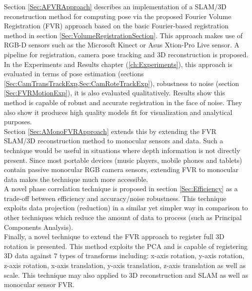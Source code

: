 Section \ref{Sec:AFVRApproach} describes an implementation of a SLAM/3D reconstruction method for computing pose via the proposed Fourier Volume Registration (FVR) approach based on the basic Fourier-based registration method in section \ref{Sec:VolumeRegistrationSection}. This approach makes use of RGB-D sensors such as the Microsoft Kinect or Asus Xtion-Pro Live sensor. A pipeline for registration, camera pose tracking and 3D reconstruction is proposed. In the Experiments and Results chapter (\ref{ch:Experiments}), this approach is evaluated in terms of pose estimation (sections \ref{Sec:CamTransTrackExp,Sec:CamRoteTrackExp}), robustness to noise (section \ref{Sec:FVRMotionExp}), it is also evaluated qualitatively. Results show this method is capable of robust and accurate registration in the face of noise. They also show it produces high quality models fit for visualization and analytical purposes.  \\

Section \ref{Sec:AMonoFVRApproach} extends this by extending the FVR SLAM/3D reconstruction method to monocular sensors and data. Such a technique would be useful in situations where depth information is not directly present. Since most portable devices (music players, mobile phones and tablets) contain passive monocular RGB camera sensors, extending FVR to monocular data makes the technique much more accessible. \\

A novel phase correlation technique is proposed in section \ref{Sec:Efficiency} as a trade-off between efficiency and accuracy/noise robustness. This technique exploits data projection (reduction) in a similar yet simpler way in comparison to other techniques which reduce the amount of data to process (such as Principal Components Analysis). \\

Finally, a novel technique to extend the FVR approach to register full 3D rotation is presented. This method exploits the PCA and is capable of registering 3D data against 7 types of transforms including: x-axis rotation, y-axis rotation, z-axis rotation, x-axis translation, y-axis translation, z-axis translation as well as scale. This technique may also applied to 3D reconstruction and SLAM as well as monocular sensor FVR. \\